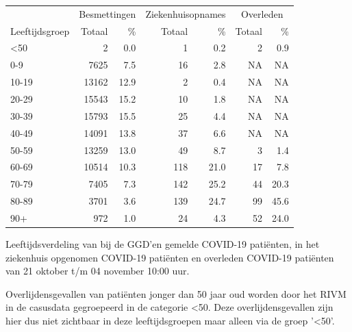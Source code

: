 \documentclass[
  english,
  man,floatsintext]{apa6}
\begin{document}
\begin{table}
\centering\begingroup\fontsize{11}{13}\selectfont

\begin{threeparttable}
\begin{tabular}{lrrrrrr}
\toprule
\multicolumn{1}{c}{ } & \multicolumn{2}{c}{Besmettingen} & \multicolumn{2}{c}{Ziekenhuisopnames} & \multicolumn{2}{c}{Overleden} \\
\cmidrule(l{3pt}r{3pt}){2-3} \cmidrule(l{3pt}r{3pt}){4-5} \cmidrule(l{3pt}r{3pt}){6-7}
Leeftijdsgroep & Totaal & \% & Totaal & \% & Totaal & \%\\
\midrule
<50 & 2 & 0.0 & 1 & 0.2 & 2 & 0.9\\
0-9 & 7625 & 7.5 & 16 & 2.8 & NA & NA\\
10-19 & 13162 & 12.9 & 2 & 0.4 & NA & NA\\
20-29 & 15543 & 15.2 & 10 & 1.8 & NA & NA\\
30-39 & 15793 & 15.5 & 25 & 4.4 & NA & NA\\
40-49 & 14091 & 13.8 & 37 & 6.6 & NA & NA\\
50-59 & 13259 & 13.0 & 49 & 8.7 & 3 & 1.4\\
60-69 & 10514 & 10.3 & 118 & 21.0 & 17 & 7.8\\
70-79 & 7405 & 7.3 & 142 & 25.2 & 44 & 20.3\\
80-89 & 3701 & 3.6 & 139 & 24.7 & 99 & 45.6\\
90+ & 972 & 1.0 & 24 & 4.3 & 52 & 24.0\\
\bottomrule
\end{tabular}
\begin{tablenotes}
\item[1] Leeftijdsverdeling van bij de GGD’en gemelde COVID-19 patiënten, in het ziekenhuis opgenomen COVID-19 patiënten en overleden COVID-19 patiënten van 21 oktober t/m 04 november 10:00 uur.
\item[2] Overlijdensgevallen van patiënten jonger dan 50 jaar oud worden door het RIVM in de casusdata gegroepeerd in de categorie <50. Deze overlijdensgevallen zijn hier dus niet zichtbaar in deze leeftijdsgroepen maar alleen via de groep '<50'.
\end{tablenotes}
\end{threeparttable}
\endgroup{}
\end{table}

\newpage
\end{document}
